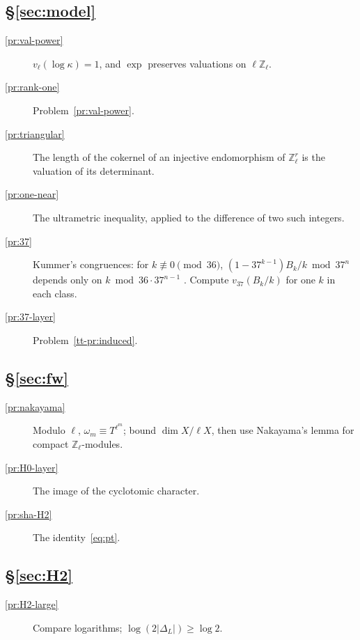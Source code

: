 \documentclass[reqno]{amsart}
\theoremstyle{definition}
\theoremstyle{plain}
\theoremstyle{remark}
\newcommand{\Z}{\mathbb{Z}}
\newcommand{\Zl}{\Z_\ell}
\begin{document}
\subsection*{\S\ref{sec:model}}
\begin{description}
\item[\ref{pr:val-power}] \(v_\ell(\log\kappa)=1\), and \(\exp\) preserves valuations on \(\ell\Zl\).
\item[\ref{pr:rank-one}] Problem~\ref{pr:val-power}.
\item[\ref{pr:triangular}] The length of the cokernel of an injective endomorphism of \(\Zl^r\) is the valuation of its determinant.
\item[\ref{pr:one-near}] The ultrametric inequality, applied to the difference of two such integers.
\item[\ref{pr:37}] Kummer's congruences: for \(k\not\equiv0\pmod{36}\), \((1-37^{k-1})B_k/k\bmod37^n\) depends only on \(k\bmod36\cdot37^{n-1}\) \cite[Ch.~5]{Wa}.  Compute \(v_{37}(B_k/k)\) for one \(k\) in each class.
\item[\ref{pr:37-layer}] Problem~\ref{tt-pr:induced}.
\end{description}

\subsection*{\S\ref{sec:fw}}
\begin{description}
\item[\ref{pr:nakayama}] Modulo \(\ell\), \(\omega_m\equiv T^{\ell^m}\); bound \(\dim X/\ell X\), then use Nakayama's lemma for compact \(\Zl\)-modules.
\item[\ref{pr:H0-layer}] The image of the cyclotomic character.
\item[\ref{pr:sha-H2}] The identity~\eqref{eq:pt}.
\end{description}

\subsection*{\S\ref{sec:H2}}
\begin{description}
\item[\ref{pr:H2-large}] Compare logarithms; \(\log(2\lvert\Delta_L\rvert)\ge\log2\).
\end{description}
\end{document}

